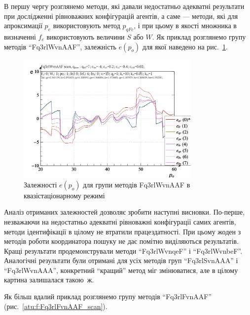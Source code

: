 В першу чергу розглянемо методи, які давали недостатньо
адекватні результати при дослідженні рівноважних конфігурацій
агентів, а саме --- методи, які для апроксимації
$ p_e $ використовують метод
$ p_{qFc} $, і при цьому в якості множника в визначенні
$ f_e $ використовують величини
$ S $ або
$ W $. Як приклад розглянемо групу методів ``Fq3rlWvnAAF'', залежність
$e(p_o)$ для якої наведено на рис.~\ref{atu:f:Fq3rlWvnAAF_scan}.

\begin{figure}[htb!]
  \begin{center}
    \includegraphics[width=0.8\textwidth]{p/scan/qls-p_p_e_Fq3rlWvnAAF_scan.png}
  \end{center}
  \caption{Залежності $e(p_o)$ для групи методів Fq3rlWvnAAF в квазістаціонарному режимі}
  \label{atu:f:Fq3rlWvnAAF_scan}
\end{figure}


Аналіз отриманих залежностей дозволяє зробити наступні
висновки. По-перше, незважаючи на недостатньо адекватні
рівноважні конфігурації самих агентів, методи ідентифікації в
цілому не втратили працездатності. При цьому жоден з методів
роботи координатора пошуку не дає помітно виділяються
результатів. Кращі результати продемонстрували методи ``Fq3rlWvnqeF''
і ``Fq3rlWvnbeF''. Аналогічні результати були отримані для усіх
методів груп ``Fq3rlSvnAAA'' і ``Fq3rlWvnAAA'', конкретний ``кращий'' метод
міг змінюватися, але в цілому картина залишалася такою~ж.

Як більш вдалий приклад розглянемо групу методів ``Fq3rlFvnAAF''
(рис.~\ref{atu:f:Fq3rlFvnAAF_scan}).

